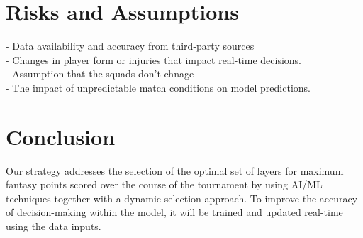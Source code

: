 \documentclass[a4paper,12pt]{article}
\begin{document}
\section{Risks and Assumptions}
- Data availability and accuracy from third-party sources\\
- Changes in player form or injuries that impact real-time decisions.\\
- Assumption that the squads don't chnage\\
- The impact of unpredictable match conditions on model predictions.

\section{Conclusion}
Our strategy addresses the selection of the optimal set of layers for maximum fantasy points scored over the course of the tournament by using AI/ML techniques together with a dynamic selection approach. To improve the accuracy of decision-making within the model, it will be trained and updated real-time using the data inputs.
\end{document}
